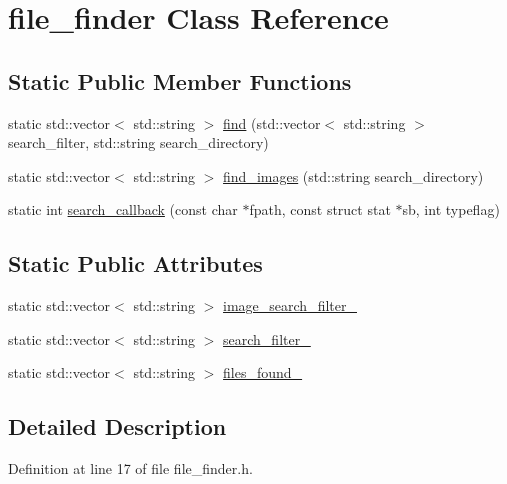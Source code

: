 \hypertarget{classfile__finder}{}\section{file\+\_\+finder Class Reference}
\label{classfile__finder}
\subsection*{Static Public Member Functions}
\begin{DoxyCompactItemize}
\item 
static std\+::vector$<$ std\+::string $>$ \hyperlink{classfile__finder_ac6119004ccec4a7256ddd2bed13f83f4}{find} (std\+::vector$<$ std\+::string $>$ search\+\_\+filter, std\+::string search\+\_\+directory)
\item 
static std\+::vector$<$ std\+::string $>$ \hyperlink{classfile__finder_aac95f082d2b413830778f97463d9aed9}{find\+\_\+images} (std\+::string search\+\_\+directory)
\item 
static int \hyperlink{classfile__finder_a1154d36a33411082bee949ed977087c7}{search\+\_\+callback} (const char $\ast$fpath, const struct stat $\ast$sb, int typeflag)
\end{DoxyCompactItemize}
\subsection*{Static Public Attributes}
\begin{DoxyCompactItemize}
\item 
static std\+::vector$<$ std\+::string $>$ \hyperlink{classfile__finder_ac566ab0ab5d5f4a7352f3394a7ae298d}{image\+\_\+search\+\_\+filter\+\_\+}
\item 
static std\+::vector$<$ std\+::string $>$ \hyperlink{classfile__finder_a407cee5bc1d68cc81e8ea0bef8f15eda}{search\+\_\+filter\+\_\+}
\item 
static std\+::vector$<$ std\+::string $>$ \hyperlink{classfile__finder_a40b67eabc93b35b47a4e32ad5146cc48}{files\+\_\+found\+\_\+}
\end{DoxyCompactItemize}


\subsection{Detailed Description}


Definition at line 17 of file file\+\_\+finder.\+h.



